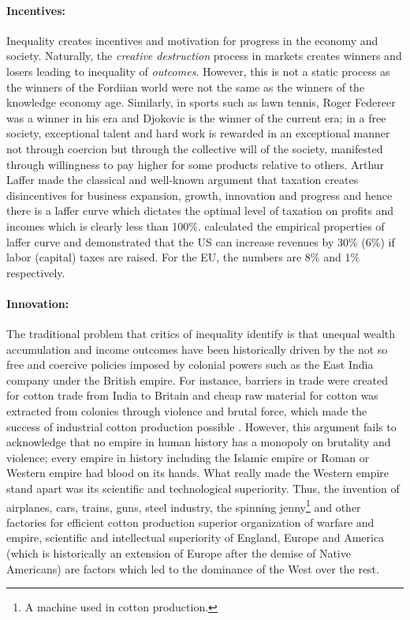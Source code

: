 \documentclass[12pt]{article}
\newcommand{\1}{\mathbbm 1}
\begin{document}
		\paragraph{Incentives:} Inequality creates incentives and motivation for progress in the economy and society. Naturally, the \textit{creative destruction} process in markets creates winners and losers leading to inequality of \textit{outcomes}. However, this is not a static process as the winners of the Fordiian world were not the same as the winners of the knowledge economy age. Similarly, in sports such as lawn tennis, Roger Federeer was a winner in his era and Djokovic is the winner of the current era; in a free society, exceptional talent and hard work is rewarded in an exceptional manner not through coercion but through the collective will of the society, manifested through willingness to pay higher for some products relative to others. Arthur Laffer made the classical and well-known argument that taxation creates disincentives for business expansion, growth, innovation and progress \cite{laffer2004laffer} and hence there is a laffer curve which dictates the optimal level of taxation on profits and incomes which is clearly less than 100\%. \cite{trabandt2011laffer} calculated the empirical properties of laffer curve and demonstrated that the US can increase revenues by 30\% (6\%) if labor (capital) taxes are raised. For the EU, the numbers are 8\% and 1\% respectively. 
		 
		
		\paragraph{Innovation:} The traditional problem that critics of inequality identify is that unequal wealth accumulation and income outcomes have been historically driven by the not so free and coercive policies imposed by colonial powers such as the East India company under the British empire. For instance, barriers in trade were created for cotton trade from India to Britain and cheap raw material for cotton was extracted from colonies through violence and brutal force, which made the success of industrial cotton production possible \cite{beckert2015empire}. However, this argument fails to acknowledge that no empire in human history has a monopoly on brutality and violence; every empire in history including the Islamic empire or Roman or Western empire had blood on its hands. What really made the Western empire stand apart was its scientific and technological superiority. Thus, the invention of airplanes, cars, trains, guns, steel industry, the spinning jenny\footnote{A machine used in cotton production.} and other factories for efficient cotton production superior organization of warfare and empire, scientific and intellectual superiority of England, Europe and America (which is historically an extension of Europe after the demise of Native Americans) are factors which led to the dominance of the West over the rest.	
			
\end{document}
